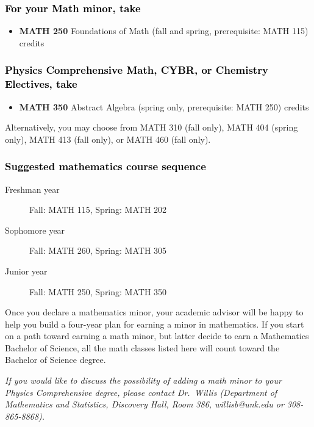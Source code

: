 \documentclass[9pt]{article}
\newenvironment{mypar}[2]
   {\begin{list}{}%
     {\setlength\leftmargin{#1}
     \setlength\rightmargin{#2}}
     \item[]}
   {\end{list}}
\begin{document}
\subsubsection*{\textcolor{black}{For your Math minor, take}}
\begin{itemize}
\item \textbf{MATH 250} Foundations of Math (fall and spring, prerequisite: MATH 115)   credits
\end{itemize}

\subsubsection*{\textcolor{black}{Physics Comprehensive Math, CYBR, or Chemistry Electives, take}}
\begin{itemize}
\item \textbf{MATH 350} Abstract Algebra (spring only, prerequisite: MATH 250)  credits
\end{itemize}
\begin{mypar}{0.5cm}{0.5cm} Alternatively, you may choose from MATH 310 (fall only), MATH 404 (spring only), MATH 413 (fall only), or MATH 460 (fall only).  \end{mypar}




\subsubsection*{\textcolor{black}{Suggested mathematics course sequence}}

\begin{description}
   \item[\phantom{xxx} Freshman year] Fall: MATH 115, Spring:  MATH 202
      \item[\phantom{xxx} Sophomore year]  Fall: MATH 260,  Spring: MATH 305
     \item[\phantom{xxx} Junior year]  Fall: MATH 250,  Spring: MATH 350
 \end{description}
  \vspace{0.1in}

 \noindent Once you declare a mathematics minor, your academic advisor will be happy to help you build a four-year plan for earning a minor in mathematics.  If you start on a path toward earning a math minor, but latter decide to earn a  Mathematics Bachelor of Science, all the math classes listed here will count toward the Bachelor of Science degree.

   \vspace{0.1in}

\noindent \textcolor{unkblue}{\emph{If you would like to discuss the possibility of  adding a math minor to your Physics Comprehensive degree, please contact \mbox{Dr.\ Willis} (Department of Mathematics and Statistics,  Discovery Hall, Room 386, willisb@unk.edu or 308-865-8868).}}
\end{document}
